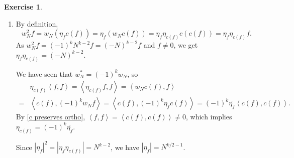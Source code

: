 \documentclass{article}
\theoremstyle{definition}
\newtheorem{example}{Exercise}
\newtheorem{lemma}{Lemma}
\theoremstyle{remark}
\newcommand{\gene}[1]{\left\langle #1 \right\rangle} %
\newcommand{\new}{\mathrm{new}}
\newcommand{\old}{\mathrm{old}}
\begin{document}
\begin{example}
\begin{enumerate}
\begin{proof}
\end{proof}
Since $W_N = i^kN^{1-\frac{k}{2}}w_N$ is self-adjoint,
we have $w_N^* = (-1)^kw_N$, and thus
\[\gene{w_Nf, g} = \gene{f, (-1)^kw_Ng} = 0\]
because $f$ is new and $(-1)^kw_Ng$ is old by \cref{w_N preserves old}.
Hence $w_N(f)$ is new, and applying the weak multiplicity one theorem completes the proof.

\item
By definition, \[w_N^2f = w_N(\eta_fc(f)) = \eta_f(w_Nc(f)) = \eta_f\eta_{c(f)}c(c(f)) = \eta_f\eta_{c(f)}f.\]
As $w_N^2f = (-1)^kN^{k-2}f = (-N)^{k-2}f$ and $f\ne 0$,
we get $\eta_f\eta_{c(f)} = (-N)^{k-2}$.

We have seen that $w_N^* = (-1)^kw_N$, so\begin{align*}
    &\eta_{c(f)}\gene{f, f} = \gene{\eta_{c(f)}f, f}
    =\gene{w_Nc(f), f}
    \\ ={}& \gene{c(f), (-1)^kw_Nf} 
    =\gene{c(f), (-1)^k\eta_fc(f)} = (-1)^k\overline{\eta_f}\gene{c(f), c(f)}.
\end{align*}
By \cref{c preserves ortho}, $\gene{f, f} = \gene{c(f), c(f)} \ne 0$,
which implies $\eta_{c(f)} = (-1)^k\overline{\eta_f}$.

Since $|\eta_f|^2 = |\eta_f\eta_{c(f)}| = N^{k-2}$,
we have $|\eta_f| = N^{k/2 -1}$.


\end{enumerate}
\end{example}
\end{document}
